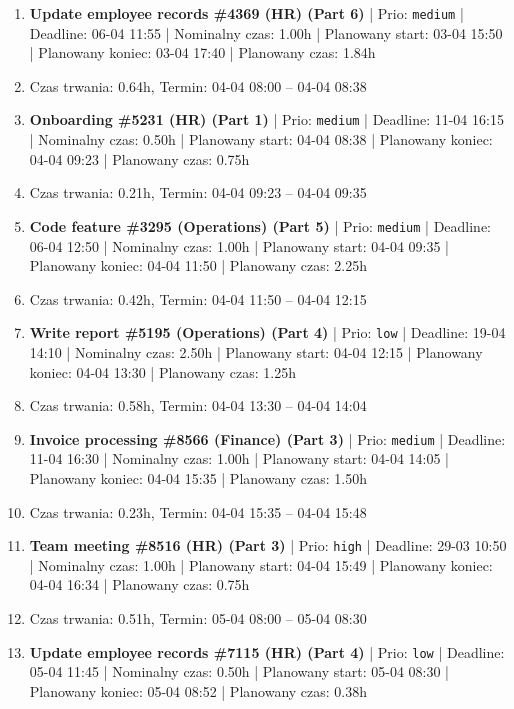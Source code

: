 {\begin{enumerate}
  \item [\textbf{14658}] \textbf{Update employee records \#4369 (HR) (Part 6)} | Prio: \texttt{medium} | Deadline: 06-04 11:55 | Nominalny czas: 1.00h | Planowany start: 03-04 15:50 | Planowany koniec: 03-04 17:40 | Planowany czas: 1.84h
  \item [\textbf{PRZERWA}] Czas trwania: 0.64h, Termin: 04-04 08:00 -- 04-04 08:38
  \item [\textbf{14671}] \textbf{Onboarding \#5231 (HR) (Part 1)} | Prio: \texttt{medium} | Deadline: 11-04 16:15 | Nominalny czas: 0.50h | Planowany start: 04-04 08:38 | Planowany koniec: 04-04 09:23 | Planowany czas: 0.75h
  \item [\textbf{PRZERWA}] Czas trwania: 0.21h, Termin: 04-04 09:23 -- 04-04 09:35
  \item [\textbf{14645}] \textbf{Code feature \#3295 (Operations) (Part 5)} | Prio: \texttt{medium} | Deadline: 06-04 12:50 | Nominalny czas: 1.00h | Planowany start: 04-04 09:35 | Planowany koniec: 04-04 11:50 | Planowany czas: 2.25h
  \item [\textbf{PRZERWA}] Czas trwania: 0.42h, Termin: 04-04 11:50 -- 04-04 12:15
  \item [\textbf{14687}] \textbf{Write report \#5195 (Operations) (Part 4)} | Prio: \texttt{low} | Deadline: 19-04 14:10 | Nominalny czas: 2.50h | Planowany start: 04-04 12:15 | Planowany koniec: 04-04 13:30 | Planowany czas: 1.25h
  \item [\textbf{PRZERWA}] Czas trwania: 0.58h, Termin: 04-04 13:30 -- 04-04 14:04
  \item [\textbf{14675}] \textbf{Invoice processing \#8566 (Finance) (Part 3)} | Prio: \texttt{medium} | Deadline: 11-04 16:30 | Nominalny czas: 1.00h | Planowany start: 04-04 14:05 | Planowany koniec: 04-04 15:35 | Planowany czas: 1.50h
  \item [\textbf{PRZERWA}] Czas trwania: 0.23h, Termin: 04-04 15:35 -- 04-04 15:48
  \item [\textbf{14624}] \textbf{Team meeting \#8516 (HR) (Part 3)} | Prio: \texttt{high} | Deadline: 29-03 10:50 | Nominalny czas: 1.00h | Planowany start: 04-04 15:49 | Planowany koniec: 04-04 16:34 | Planowany czas: 0.75h
  \item [\textbf{PRZERWA}] Czas trwania: 0.51h, Termin: 05-04 08:00 -- 05-04 08:30
  \item [\textbf{14701}] \textbf{Update employee records \#7115 (HR) (Part 4)} | Prio: \texttt{low} | Deadline: 05-04 11:45 | Nominalny czas: 0.50h | Planowany start: 05-04 08:30 | Planowany koniec: 05-04 08:52 | Planowany czas: 0.38h

\end{enumerate}}
